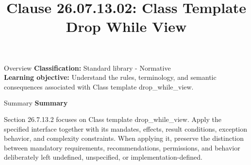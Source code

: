 \documentclass[10pt,letterpaper]{article}
\title{Clause 26.07.13.02: Class Template Drop While View}
\author{}
\date{}
\begin{document}
\maketitle
\begin{CornellOverviewBox}{Overview}
\textbf{Classification:} Standard library - Normative\\[2pt]
\textbf{Learning objective:} Understand the rules, terminology, and semantic consequences associated with Class template drop\_while\_view.
\end{CornellOverviewBox}\begin{CornellSummaryBox}{Summary}
{\sffamily\bfseries\color{Accent} Summary}\par\vspace{3pt}Section 26.7.13.2 focuses on Class template drop\_while\_view. Apply the specified interface together with its mandates, effects, result conditions, exception behavior, and complexity constraints. When applying it, preserve the distinction between mandatory requirements, recommendations, permissions, and behavior deliberately left undefined, unspecified, or implementation-defined.
\end{CornellSummaryBox}
\end{document}
